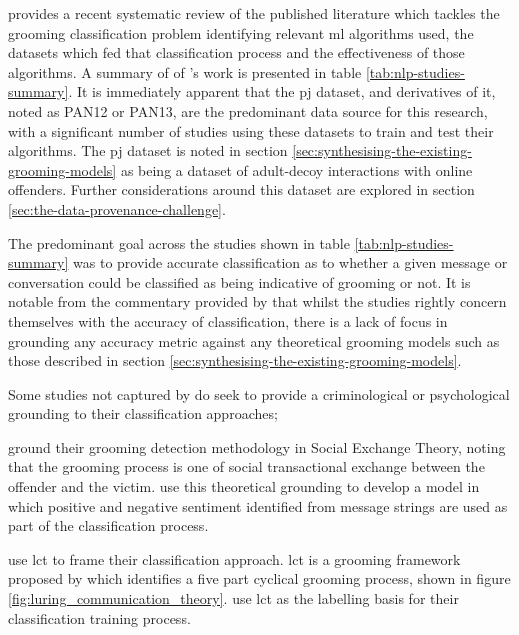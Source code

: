 \documentclass[12pt,a4paper,oneside]{report}
\begin{document}
\citet{leiva-bianchi2025effectiveness} provides a recent systematic review of the published literature which tackles the grooming classification problem identifying relevant \gls{ml} algorithms used, the datasets which fed that classification process and the effectiveness of those algorithms.  A summary of of \citet{leiva-bianchi2025effectiveness}'s work is presented in table \ref{tab:nlp-studies-summary}.  It is immediately apparent that the \gls{pj} dataset, and derivatives of it, noted as PAN12 or PAN13, are the predominant data source for this research, with a significant number of studies using these datasets to train and test their algorithms.  The \gls{pj} dataset is noted in section \ref{sec:synthesising-the-existing-grooming-models} as being a dataset of adult-decoy interactions with online offenders.  Further considerations around this dataset are explored in section \ref{sec:the-data-provenance-challenge}.

The predominant goal across the studies shown in table \ref{tab:nlp-studies-summary} was to provide accurate classification as to whether a given message or conversation could be classified as being indicative of grooming or not.  It is notable from the commentary provided by \citet{leiva-bianchi2025effectiveness} that whilst the studies rightly concern themselves with the accuracy of classification, there is a lack of focus in grounding any accuracy metric against any theoretical grooming models such as those described in section \ref{sec:synthesising-the-existing-grooming-models}.  

Some studies not captured by \citet{leiva-bianchi2025effectiveness} do seek to provide a criminological or psychological grounding to their classification approaches;

\citet{hamm2025comparing} ground their grooming detection methodology in Social Exchange Theory, noting that the grooming process is one of social transactional exchange between the offender and the victim.  \citet{hamm2025comparing} use this theoretical grounding to develop a model in which positive and negative sentiment identified from message strings are used as part of the classification process. 

\citet{an2025revisiting} use \gls{lct} to frame their classification approach.  \gls{lct} is a grooming framework proposed by \citet{olson2007entrapping} which identifies a five part cyclical grooming process, shown in figure \ref{fig:luring_communication_theory}.  \cite{an2025revisiting} use \gls{lct} as the labelling basis for their classification training process.
\end{document}
